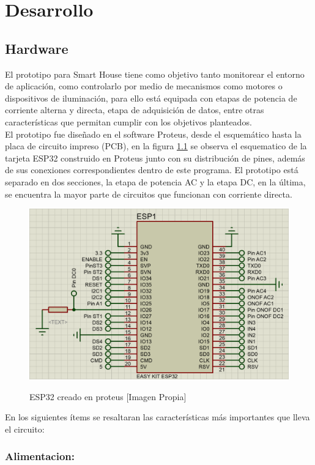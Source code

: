 \chapter{Desarrollo}

\section{Hardware}\label{sec:hw}

El prototipo para Smart House tiene como objetivo tanto monitorear el entorno de aplicación, como controlarlo por medio de mecanismos como motores o dispositivos de iluminación, para ello está equipada con etapas de potencia de corriente alterna y directa, etapa de adquisición de datos, entre otras características que permitan cumplir con los objetivos planteados.\\ 

El prototipo fue diseñado en el software Proteus, desde el esquemático hasta la placa de circuito impreso (PCB), en la figura \ref{fig:esp32} se observa el esquematico de la tarjeta ESP32 construido en Proteus junto con su distribución de pines, además de sus conexiones correspondientes dentro de este programa. El prototipo está separado en dos secciones, la etapa de potencia AC y la etapa DC, en la última, se encuentra la mayor parte de circuitos que funcionan con corriente directa.\\

\begin{figure}[H]
	\centering
	\caption{ESP32 creado en proteus [Imagen Propia]}
	\includegraphics[width=0.5\linewidth]{Imagenes/ESP32}	
	\label{fig:esp32}
\end{figure}

En los siguientes ítems se resaltaran las características más importantes que lleva el circuito:\\

	\subsection{Alimentacion:}
	
